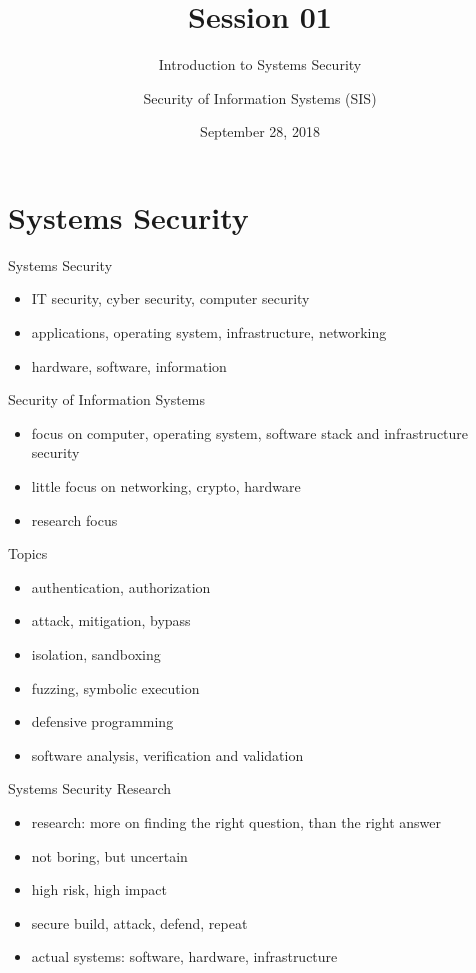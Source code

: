 \documentclass{curs}
\title[Session 01]{Session 01}
\subtitle{Introduction to Systems Security}
\author{Security of Information Systems (SIS)}
\date{September 28, 2018}
\begin{document}
\frame{\titlepage}


\section{Systems Security}

\begin{frame}{Systems Security}
  \begin{itemize}
    \pause \item IT security, cyber security, computer security
    \pause \item applications, operating system, infrastructure, networking
    \pause \item hardware, software, information
  \end{itemize}
\end{frame}

\begin{frame}{Security of Information Systems}
  \begin{itemize}
    \pause \item focus on computer, operating system, software stack and infrastructure security
    \pause \item little focus on networking, crypto, hardware
    \pause \item research focus
  \end{itemize}
\end{frame}

\begin{frame}{Topics}
  \begin{itemize}
    \pause \item authentication, authorization
    \pause \item attack, mitigation, bypass
    \pause \item isolation, sandboxing
    \pause \item fuzzing, symbolic execution
    \pause \item defensive programming
    \pause \item software analysis, verification and validation
  \end{itemize}
\end{frame}

\begin{frame}{Systems Security Research}
  \begin{itemize}
    \pause \item research: more on finding the right question, than the right answer
    \pause \item not boring, but uncertain
    \pause \item high risk, high impact
    \pause \item secure build, attack, defend, repeat
    \pause \item actual systems: software, hardware, infrastructure
  \end{itemize}
\end{frame}
\end{document}
